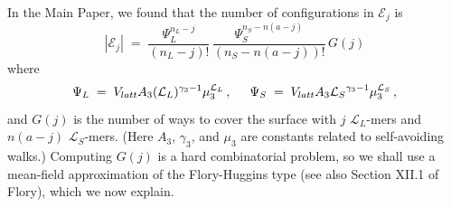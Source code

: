 \documentclass[journal=mamobx,manuscript=article]{achemso}
\newcommand{\leng}{\mathcal{L}}
\begin{document}
In the Main Paper, we found that the number of configurations in $\mathcal{E}_j$ is
\begin{equation}
    |\mathcal{E}_j|  
      \; = \; \frac{ \Psi_L^{n_L-j} }{(n_L-j)!} \,
          \frac{ \Psi_S^{n_S-n(a-j)} }{(n_S-n(a-j))!} \,  G(j)
        \label{eq.Yjsupp}
\end{equation}
where 
\begin{equation}
    \label{eq.psidefsupp}   
   \Psi_L\;=\;V_{latt} A_3 (\leng_L)^{\gamma_3-1} \mu_{3}^{\leng_L} \,,  
    \hspace{5mm} %
     \Psi_S \;=\; V_{latt}A_3{\leng_S}^{\gamma_3-1}\mu_3^{\leng_S} \,,
\end{equation}
and $G(j)$ is the number of ways to cover the surface
with $j$ $\leng_L$-mers and $n(a-j)$ $\leng_S$-mers.
(Here $A_3$, $\gamma_3$, and $\mu_3$ are constants 
related to self-avoiding walks.)  
Computing $G(j)$ is a hard combinatorial problem,
so we shall use a mean-field approximation 
of the Flory-Huggins type 
(see also Section XII.1 of Flory\cite{Flory1953}),
which we now explain.
\end{document}
